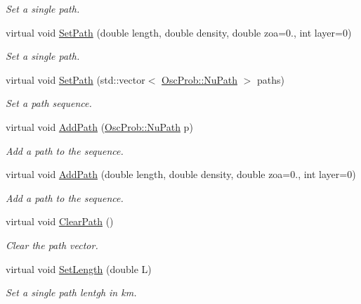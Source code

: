 \begin{DoxyCompactItemize}
\begin{DoxyCompactList}\small\item\em Set a single path. \end{DoxyCompactList}\item 
virtual void \hyperlink{classOscProb_1_1PMNS__Base_a35b983270613072a3df58b574d80dbfd}{Set\+Path} (double length, double density, double zoa=0., int layer=0)
\begin{DoxyCompactList}\small\item\em Set a single path. \end{DoxyCompactList}\item 
virtual void \hyperlink{classOscProb_1_1PMNS__Base_a637d19dd850b4246507796526622643c}{Set\+Path} (std\+::vector$<$ \hyperlink{structOscProb_1_1NuPath}{Osc\+Prob\+::\+Nu\+Path} $>$ paths)
\begin{DoxyCompactList}\small\item\em Set a path sequence. \end{DoxyCompactList}\item 
virtual void \hyperlink{classOscProb_1_1PMNS__Base_a887dc9d4dc569ec0cdef3933b4c60efc}{Add\+Path} (\hyperlink{structOscProb_1_1NuPath}{Osc\+Prob\+::\+Nu\+Path} p)
\begin{DoxyCompactList}\small\item\em Add a path to the sequence. \end{DoxyCompactList}\item 
virtual void \hyperlink{classOscProb_1_1PMNS__Base_ab7f89ad9e7e1224adaa59d3c41594cd9}{Add\+Path} (double length, double density, double zoa=0., int layer=0)
\begin{DoxyCompactList}\small\item\em Add a path to the sequence. \end{DoxyCompactList}\item 
virtual void \hyperlink{classOscProb_1_1PMNS__Base_aefe521239031c418cfaaaa550a6e13bb}{Clear\+Path} ()
\begin{DoxyCompactList}\small\item\em Clear the path vector. \end{DoxyCompactList}\item 
virtual void \hyperlink{classOscProb_1_1PMNS__Base_a6241325b1bd28cafa556daaecbe4ed62}{Set\+Length} (double L)
\begin{DoxyCompactList}\small\item\em Set a single path lentgh in km. \end{DoxyCompactList}\item 

\end{DoxyCompactItemize}
